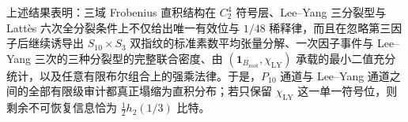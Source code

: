 

\noindent
上述结果表明：三域 Frobenius 直积结构在 \(C_2^4\) 符号层、Lee--Yang 三分裂型与 Latt\`es 六次全分裂条件上不仅给出唯一有效位与 \(1/48\) 稀释律，而且在忽略第三因子后继续诱导出 \(S_{10}\times S_3\) 双指纹的标准素数平均张量分解、一次因子事件与 Lee--Yang 三次的三种分裂型的完整联合密度、由 \((\mathbf 1_{B_{\mathrm{root}}},\chi_{\mathrm{LY}})\) 承载的最小二值充分统计，以及任意有限布尔组合上的强乘法律。于是，\(P_{10}\) 通道与 Lee--Yang 通道之间的全部有限级审计都真正塌缩为直积分布；若只保留 \(\chi_{\mathrm{LY}}\) 这一单一符号位，则剩余不可恢复信息恰为 \(\frac12 h_2(1/3)\) 比特。

\endinput
